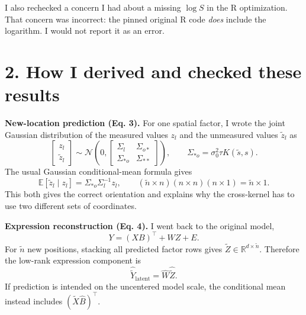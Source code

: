 \documentclass[11pt,letterpaper]{article}
\newcommand{\R}{\mathbb R}
\newcommand{\m}{\mathrm}
\begin{document}
I also rechecked a concern I had about a missing $\log S$ in the R optimization. That concern was incorrect: the pinned original R code \emph{does} include the logarithm. I would not report it as an error.

\section*{2. How I derived and checked these results}

\textbf{New-location prediction (Eq. 3).} For one spatial factor, I wrote the joint Gaussian distribution of the measured values $z_l$ and the unmeasured values $\widetilde z_l$ as
\begin{equation}
\begin{bmatrix} z_l\\ \widetilde z_l \end{bmatrix}
\sim\mathcal N\!\left(0,
\begin{bmatrix}
\Sigma_l & \Sigma_{o*}\\
\Sigma_{*o} & \Sigma_{**}
\end{bmatrix}\right),
\qquad \Sigma_{*o}=\sigma_0^2\tau K(\widetilde s,s).
\end{equation}
The usual Gaussian conditional-mean formula gives
\begin{equation}
\boxed{\mathbb E[\widetilde z_l\mid z_l]=\Sigma_{*o}\Sigma_l^{-1}z_l},
\qquad
(\widetilde n\!\times\! n)(n\!\times\!n)(n\!\times\!1)
=\widetilde n\!\times\!1.
\end{equation}
This both gives the correct orientation and explains why the cross-kernel has to use two different sets of coordinates.

\textbf{Expression reconstruction (Eq. 4).} I went back to the original model,
\begin{equation}
Y=(XB)^\top+WZ+E.
\end{equation}
For $\widetilde n$ new positions, stacking all predicted factor rows gives $\widetilde Z\in\R^{d\times\widetilde n}$. Therefore the low-rank expression component is
\begin{equation}
\boxed{\widehat{\widetilde Y}_{\m{latent}}=\widehat W\widehat{\widetilde Z}}.
\end{equation}
If prediction is intended on the uncentered model scale, the conditional mean instead includes $(\widetilde X\widehat B)^\top$.
\end{document}
